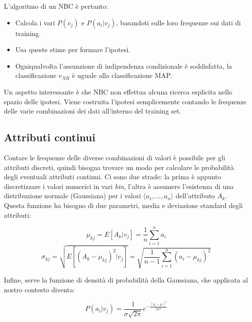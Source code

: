 L'algoritmo di un NBC è pertanto:
\begin{itemize}
	\item Calcola i vari $P(v_j)$ e $P(a_i|v_j)$, basandoti sulle loro frequenze sui dati di training.
	\item Usa queste stime per formare l'ipotesi.
	\item Ogniqualvolta l'assunzione di indipendenza condizionale è soddisfatta, la classificazione $v_{NB}$ è uguale alla classificazione MAP.
\end{itemize}

Un aspetto interessante è che NBC non effettua alcuna ricerca esplicita nello spazio delle ipotesi. Viene costruita l'ipotesi semplicemente contando le frequenze delle varie combinazioni dei dati all'interno del training set.

\subsection*{Attributi continui}
Contare le frequenze delle diverse combinazioni di valori è possibile per gli attributi discreti, quindi bisogna trovare un modo per calcolare le probabilità degli eventuali attributi continui. Ci sono due strade: la prima è appunto discretizzare i valori numerici in vari \emph{bin}, l'altra è assumere l'esistenza di una distribuzione normale (Gaussiana) per i valori $\langle a_1, ..., a_n \rangle$ dell'attributo $A_k$. Questa funzione ha bisogno di due parametri, media e deviazione standard degli attributi:

$$ \mu_{kj} = E[A_k | v_j] = \frac{1}{n} \sum_{i = 1}^{n} a_i$$
$$ \sigma_{kj} = \sqrt{ E[(A_k - \mu_{kj})^2 | v_j] } = \sqrt{ \frac{1}{n-1} \sum_{i = 1}^{n} (a_i - \mu_{kj})^2 } $$

Infine, serve la funzione di densità di probabilità della Gaussiana, che applicata al nostro contesto diventa:

$$ P(a_i | v_j) = \frac{1}{\sigma\sqrt{2\pi}} e^{-\frac{(a_i-\mu)^2}{2\sigma^2}} $$
